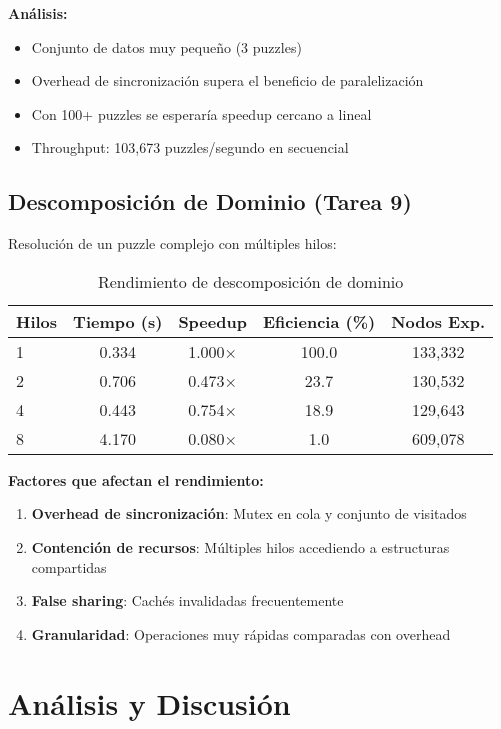 \documentclass[12pt,a4paper]{article}
\begin{document}
\textbf{Análisis:}
\begin{itemize}
    \item Conjunto de datos muy pequeño (3 puzzles)
    \item Overhead de sincronización supera el beneficio de paralelización
    \item Con 100+ puzzles se esperaría speedup cercano a lineal
    \item Throughput: 103,673 puzzles/segundo en secuencial
\end{itemize}

\subsection{Descomposición de Dominio (Tarea 9)}

Resolución de un puzzle complejo con múltiples hilos:

\begin{table}[h]
\centering
\caption{Rendimiento de descomposición de dominio}
\begin{tabular}{@{}lcccc@{}}
\toprule
\textbf{Hilos} & \textbf{Tiempo (s)} & \textbf{Speedup} & \textbf{Eficiencia (\%)} & \textbf{Nodos Exp.} \\
\midrule
1 & 0.334 & 1.000× & 100.0 & 133,332 \\
2 & 0.706 & 0.473× & 23.7 & 130,532 \\
4 & 0.443 & 0.754× & 18.9 & 129,643 \\
8 & 4.170 & 0.080× & 1.0 & 609,078 \\
\bottomrule
\end{tabular}
\end{table}

\textbf{Factores que afectan el rendimiento:}
\begin{enumerate}
    \item \textbf{Overhead de sincronización}: Mutex en cola y conjunto de visitados
    \item \textbf{Contención de recursos}: Múltiples hilos accediendo a estructuras compartidas
    \item \textbf{False sharing}: Cachés invalidadas frecuentemente
    \item \textbf{Granularidad}: Operaciones muy rápidas comparadas con overhead
\end{enumerate}

\section{Análisis y Discusión}
\end{document}
